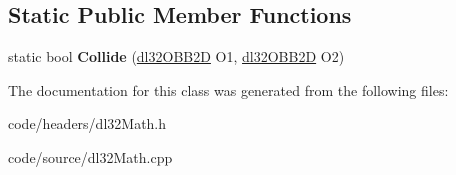 \subsection*{Static Public Member Functions}
\begin{DoxyCompactItemize}
\item 
\hypertarget{classdl32_o_b_b2_d_a7e09c0cdbbd4d8829d3b7aa1ec590ac8}{static bool {\bfseries Collide} (\hyperlink{classdl32_o_b_b2_d}{dl32\-O\-B\-B2\-D} O1, \hyperlink{classdl32_o_b_b2_d}{dl32\-O\-B\-B2\-D} O2)}\label{classdl32_o_b_b2_d_a7e09c0cdbbd4d8829d3b7aa1ec590ac8}

\end{DoxyCompactItemize}


The documentation for this class was generated from the following files\-:\begin{DoxyCompactItemize}
\item 
code/headers/dl32\-Math.\-h\item 
code/source/dl32\-Math.\-cpp\end{DoxyCompactItemize}
